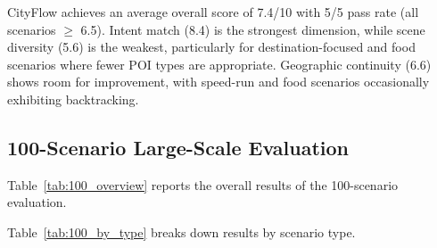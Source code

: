 CityFlow achieves an average overall score of 7.4/10 with 5/5 pass rate (all scenarios $\geq$ 6.5). Intent match (8.4) is the strongest dimension, while scene diversity (5.6) is the weakest, particularly for destination-focused and food scenarios where fewer POI types are appropriate. Geographic continuity (6.6) shows room for improvement, with speed-run and food scenarios occasionally exhibiting backtracking.

\subsection{100-Scenario Large-Scale Evaluation}

Table~\ref{tab:100_overview} reports the overall results of the 100-scenario evaluation.

\begin{table}[!t]
\centering
\caption{100-scenario evaluation summary. Test: 2026-06-02, 4 workers, total 2263.6s.}
\label{tab:100_overview}
\end{table}

Table~\ref{tab:100_by_type} breaks down results by scenario type.

\begin{table}[!t]
\centering
\caption{100-scenario results by scenario type (20 scenarios each).}
\label{tab:100_by_type}
\end{table}

